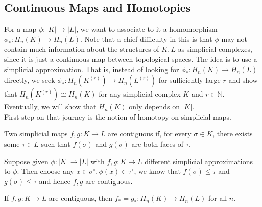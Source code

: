 \subsection{Continuous Maps and Homotopies}
For a map $\phi:|K|\to|L|$, we want to associate to it a homomorphism $\phi_\ast:H_n(K)\to H_n(L)$.
Note that a chief difficulty in this is that $\phi$ may not contain much information about the structures of $K,L$ as simplicial complexes, since it is just a continuous map between topological spaces.
The idea is to use a simplicial approximation.
That is, instead of looking for $\phi_\ast:H_n(K)\to H_n(L)$ directly, we seek $\phi_\ast:H_n(K^{(r)})\to H_n(L^{(r)})$ for sufficiently large $r$ and show that $H_n(K^{(r)})\cong H_n(K)$ for any simplicial complex $K$ and $r\in\mathbb N$.
Eventually, we will show that $H_n(K)$ only depends on $|K|$.\\
First step on that journey is the notion of homotopy on simplicial maps.
\begin{definition}
    Two simplicial maps $f,g:K\to L$ are contiguous if, for every $\sigma\in K$, there exists some $\tau\in L$ such that $f(\sigma)$ and $g(\sigma)$ are both faces of $\tau$.
\end{definition}
\begin{remark}
    Suppose given $\phi:|K|\to |L|$ with $f,g:K\to L$ different simplicial approximations to $\phi$.
    Then choose any $x\in\sigma^\circ,\phi(x)\in\tau^\circ$, we know that $f(\sigma)\le\tau$ and $g(\sigma)\le\tau$ and hence $f,g$ are contiguous.
\end{remark}
\begin{lemma}
    If $f,g:K\to L$ are contiguous, then $f_\ast=g_\ast:H_n(K)\to H_n(L)$ for all $n$.
\end{lemma}
